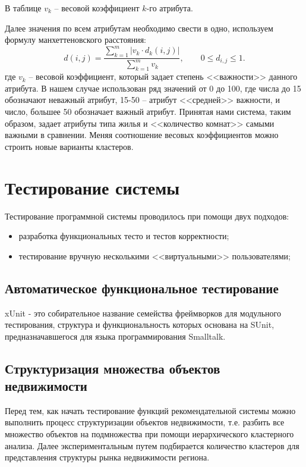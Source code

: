 \documentclass[a4paper,14pt,openany,final]{extreport} %
\begin{document}
{\begin{table}[htbp]
  В таблице $v_k$ -- весовой коэффициент $k$-го атрибута.
\end{table}

Далее значения по всем атрибутам необходимо свести в одно, используем формулу манхеттеновского расстояния:
\[
  d(i,j)=\frac{\sum\limits_{k=1}^m|v_k\cdot d_k(i,j)|}{\sum\limits_{k=1}^m v_k}, \qquad 0\leqslant d_{i,j}\leqslant 1.
\]
где $v_k$ -- весовой коэффициент, который задает степень <<важности>> данного атрибута. В нашем случае использован ряд значений от 0 до 100, где числа до 15 обозначают неважный атрибут, 15-50 -- атрибут <<средней>> важности, и число, большее 50 обозначает важный атрибут. Принятая нами система, таким образом, задает атрибуты типа жилья и <<количество комнат>> самыми важными в сравнении. Меняя соотношение весовых коэффициентов можно строить новые варианты кластеров.

\section{Тестирование системы}
Тестирование программной системы проводилось при помощи двух подходов:
\begin{itemize}
\item разработка функциональных тесто и тестов корректности;
\item тестирование вручную несколькими <<виртуальными>> пользователями;
\end{itemize}

\subsection{Автоматическое функциональное тестирование}
xUnit - это собирательное название семейства фреймворков для модульного тестирования, структура и функциональность которых основана на SUnit, предназначавшегося для языка программирования Smalltalk.

\subsection{Структуризация множества объектов недвижимости}
Перед тем, как начать тестирование функций рекомендательной системы можно выполнить процесс структуризации объектов недвижимости, т.е. разбить все множество объектов на подмножества при помощи иерархического кластерного анализа. Далее экспериментальным путем подбирается количество кластеров для представления структуры рынка недвижимости региона.

}
\end{document}
